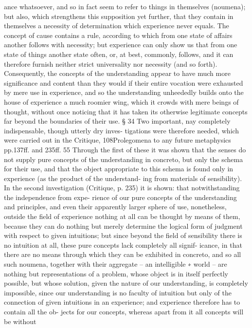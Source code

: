 ance whatsoever, and so in fact seem to refer to things in themselves
(noumena); but also, which strengthens this supposition yet further, that
they contain in themselves a necessity of determination which experience
never equals. The concept of cause contains a rule, according to which
from one state of affairs another follows with necessity; but experience
can only show us that from one state of things another state often, or,
at best, commonly, follows, and it can therefore furnish neither strict
universality nor necessity (and so forth).
Consequently, the concepts of the understanding appear to have much
more signiﬁcance and content than they would if their entire vocation
were exhausted by mere use in experience, and so the understanding
unheededly builds onto the house of experience a much roomier wing,
which it crowds with mere beings of thought, without once noticing that
it has taken its otherwise legitimate concepts far beyond the boundaries
of their use.
§ 34
Two important, nay completely indispensable, though utterly dry inves-
tigations were therefore needed, which were carried out in the Critique,
108Prolegomena to any future metaphysics
pp.137ff. and 235ff. 55 Through the ﬁrst of these it was shown that the
senses do not supply pure concepts of the understanding in concreto, but
only the schema for their use, and that the object appropriate to this
schema is found only in experience (as the product of the understand-
ing from materials of sensibility). In the second investigation (Critique,
p. 235) it is shown: that notwithstanding the independence from expe-
rience of our pure concepts of the understanding and principles, and
even their apparently larger sphere of use, nonetheless, outside the ﬁeld
of experience nothing at all can be thought by means of them, because
they can do nothing but merely determine the logical form of judgment
with respect to given intuitions; but since beyond the ﬁeld of sensibility
there is no intuition at all, these pure concepts lack completely all signif-
icance, in that there are no means through which they can be exhibited
in concreto, and so all such noumena, together with their aggregate – an
intelligible ∗ world – are nothing but representations of a problem, whose
object is in itself perfectly possible, but whose solution, given the nature
of our understanding, is completely impossible, since our understanding
is no faculty of intuition but only of the connection of given intuitions
in an experience; and experience therefore has to contain all the ob-
jects for our concepts, whereas apart from it all concepts will be without
